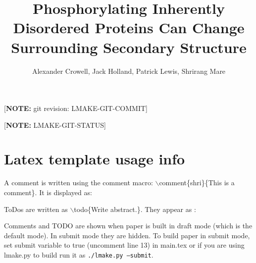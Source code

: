 \documentclass[twocolumn]{article}     %
\newcommand{\comment}[2]{\relax}
\newcommand{\todo}[1]{\relax}
\newcommand{\comment}[2]{\textcolor{commentcolor}{(#2 \emph{--#1})}}
\newcommand{\todo}[1]{\textcolor{commentcolor}{(TODO: #1)}}
\begin{document}
\title{Phosphorylating Inherently Disordered Proteins Can Change Surrounding Secondary Structure}

\author{Alexander Crowell, Jack Holland, Patrick Lewis, Shrirang Mare}


\date{}

\maketitle

\ifsubmit
{}

[\textbf{NOTE:} git revision: LMAKE-GIT-COMMIT]

[\textbf{NOTE:} LMAKE-GIT-STATUS]

\fi



\ifsubmit
\else

\section*{Latex template usage info}

A comment is written using the comment macro: $\backslash$comment\{shri\}\{This is a comment\}. It is displayed as:

\comment{shri}{This is a comment}


ToDos are written as $\backslash$todo\{Write abstract.\}. They appear as :

\todo{Write abstract.}

Comments and TODO are shown when paper is built in draft mode (which is the default mode). In submit mode they are hidden. To build paper in submit mode, set submit variable to true (uncomment line 13) in main.tex or if you are using lmake.py to build run it as \texttt{./lmake.py --submit}.
\fi










\end{document}
